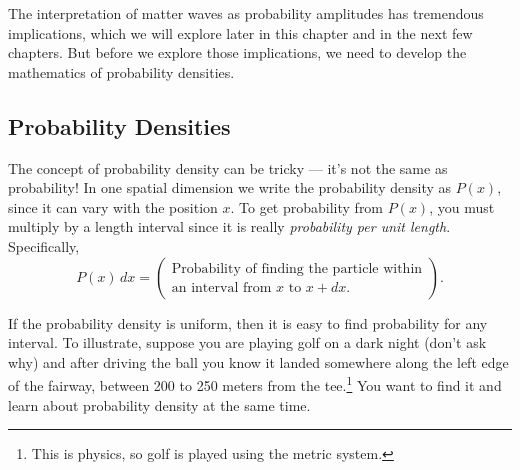 The interpretation of matter waves as probability amplitudes has
tremendous implications, which we will explore later in this chapter
and in the next few chapters. But before we explore those implications,
we need to develop the  mathematics of probability densities.

\subsection{Probability Densities}

The concept of probability density can be tricky --- it's not the same
as probability!  In one spatial dimension we write the probability
density as $P(x)$, since it can vary with the position $x$.  To get
probability from $P(x)$, you must multiply by a length interval since
it is really {\em probability per unit length}.  Specifically,
\begin{equation}
P(x)\, dx = \left(\begin{array}{l}
          \text{Probability of finding the particle within} \\
          \text{an interval from $x$ to $x+dx$. }
                    \end{array}\right).
\end{equation}

If the probability density is uniform, then it is easy to find
probability for any interval.  To illustrate, suppose you are playing
golf on a dark night (don't ask why) and after driving the ball you
know it landed somewhere along the left edge of the fairway, between
200 to 250 meters from the tee.\footnote{This is physics, so golf is
  played using the metric system.}  You want to find it and learn
about probability density at the same time.

